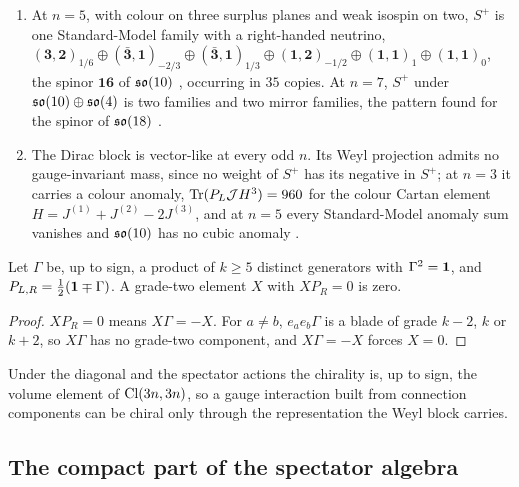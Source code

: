 \begin{proposition}
\begin{enumerate}[label=(\roman*),leftmargin=2.2em]
lepton number as the fourth colour \cite{PatiSalam}. The eight gluons are neutral, the six remaining generators of $\so6$ carry $q=\pm2$ and turn
the triplet into the singlet, as leptoquark bosons do. The copy $\so3$ acts on the Dirac block with Casimir $6$, that is isospin two: it is not weak
isospin.
\item At $n=5$, with colour on three surplus planes and weak isospin on two, $S^+$ is one Standard-Model family with a right-handed neutrino,
$(\mathbf3,\mathbf2)_{1/6}\oplus(\bar{\mathbf3},\mathbf1)_{-2/3}\oplus(\bar{\mathbf3},\mathbf1)_{1/3}\oplus(\mathbf1,\mathbf2)_{-1/2}\oplus(\mathbf1,\mathbf1)_1\oplus(\mathbf1,\mathbf1)_0$,
the spinor $\mathbf{16}$ of $\mathfrak{so}(10)$ \cite{FritzschMinkowski,Slansky}, occurring in $35$ copies. At $n=7$, $S^+$ under $\mathfrak{so}(10)\oplus\mathfrak{so}(4)$ is two
families and two mirror families, the pattern found for the spinor of $\mathfrak{so}(18)$ \cite{WilczekZee}.
\item The Dirac block is vector-like at every odd $n$. Its Weyl projection admits no gauge-invariant mass, since no weight of $S^+$ has its negative in
$S^+$; at $n=3$ it carries a colour anomaly, $\operatorname{Tr}(P_L\mathcal JH^3)=960$ for the colour Cartan element $H=J^{(1)}+J^{(2)}-2J^{(3)}$, and at $n=5$ every
Standard-Model anomaly sum vanishes and $\mathfrak{so}(10)$ has no cubic anomaly \cite{GeorgiGlashow72}.
\end{enumerate}
\end{proposition}

\begin{lemma}
\label{lem:nochiral}
Let $\Gamma$ be, up to sign, a product of $k\ge5$ distinct generators with $\Gamma^2=\mathbf 1$, and $P_{L,R}=\tfrac12(\mathbf 1\mp\Gamma)$. A grade-two element $X$
with $XP_R=0$ is zero.
\end{lemma}

\begin{proof}
$XP_R=0$ means $X\Gamma=-X$. For $a\neq b$, $e_ae_b\Gamma$ is a blade of grade $k-2$, $k$ or $k+2$, so $X\Gamma$ has no grade-two component, and
$X\Gamma=-X$ forces $X=0$.
\end{proof}

Under the diagonal and the spectator actions the chirality is, up to sign, the volume element of $\mathrm{Cl}(3n,3n)$, so a gauge interaction built from
connection components can be chiral only through the representation the Weyl block carries.

\subsection{The compact part of the spectator algebra}

